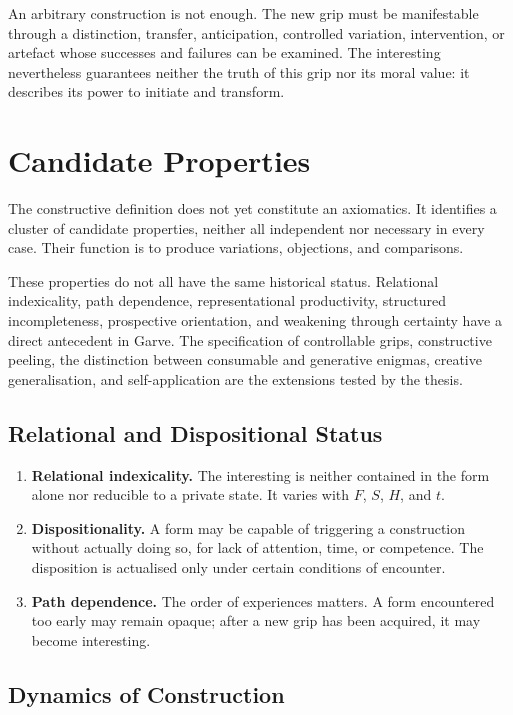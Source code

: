 \documentclass[11pt,a4paper]{article}
\begin{document}
An arbitrary construction is not enough. The new grip must be manifestable
through a distinction, transfer, anticipation, controlled variation,
intervention, or artefact whose successes and failures can be examined. The
interesting nevertheless guarantees neither the truth of this grip nor its
moral value: it describes its power to initiate and transform.

\section{Candidate Properties}

The constructive definition does not yet constitute an axiomatics. It identifies
a cluster of candidate properties, neither all independent nor necessary in
every case. Their function is to produce variations, objections, and
comparisons.

These properties do not all have the same historical status. Relational
indexicality, path dependence, representational productivity, structured
incompleteness, prospective orientation, and weakening through certainty have a
direct antecedent in Garve. The specification of controllable grips,
constructive peeling, the distinction between consumable and generative
enigmas, creative generalisation, and self-application are the extensions tested
by the thesis.

\subsection{Relational and Dispositional Status}

\begin{enumerate}
  \item \textbf{Relational indexicality.} The interesting is neither contained
        in the form alone nor reducible to a private state. It varies with
        \(F\), \(S\), \(H\), and \(t\).
  \item \textbf{Dispositionality.} A form may be capable of triggering a
        construction without actually doing so, for lack of attention, time, or
        competence. The disposition is actualised only under certain conditions
        of encounter.
  \item \textbf{Path dependence.} The order of experiences matters. A form
        encountered too early may remain opaque; after a new grip has been
        acquired, it may become interesting.
\end{enumerate}

\subsection{Dynamics of Construction}
\end{document}
